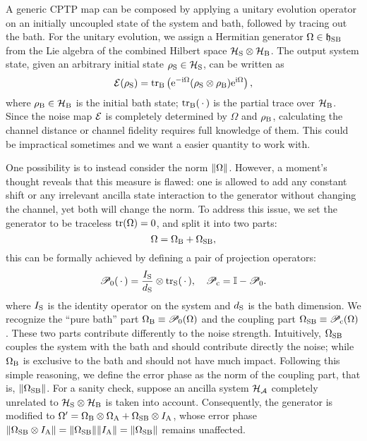 \documentclass[aps,pra,reprint,superscriptaddress]{revtex4-2}
\newcommand{\Ppb}{\mathscr{P}_{\mathrm{0}}}
\newcommand{\Pcp}{\mathscr{P}_{\mathrm{c}}}
\begin{document}
A generic CPTP map can be composed by applying a unitary evolution operator on an initially uncoupled state of the system and bath, followed by tracing out the bath.
For the unitary evolution, we assign a Hermitian generator $\Omega\in\mathfrak{h}_{\mathrm{SB}}$ from the Lie algebra of the combined Hilbert space $\mathcal{H}_{\mathrm{S}}\otimes\mathcal{H}_{\mathrm{B}}$. The output system state, given an arbitrary initial state $\rho_\mathrm{S}\in\mathcal{H}_{\mathrm{S}}$, can be written as
\begin{equation}\label{eq:output-rhos}
\mathcal{E}(\rho_\mathrm{S}) = \operatorname{\operatorname{tr}_\mathrm{B}}  \left(
\mathrm{e}^{-\mathrm{i} \Omega} (\rho_\mathrm{S} \otimes \rho_\mathrm{B}) \mathrm{e}^{\mathrm{i} \Omega} \right),
\end{equation}
where $\rho_\mathrm{B}\in\mathcal{H}_{\mathrm{B}}$ is the initial bath state; $\operatorname{\operatorname{tr}_\mathrm{B}}({\,\cdot\,})$ is the partial trace over $\mathcal{H}_{\mathrm{B}}$.
Since the noise map $\mathcal{E}$ is completely determined by $\Omega$ and $\rho_\mathrm{B}$, 
calculating the channel distance or channel fidelity requires full knowledge of them.  This could be impractical sometimes and we want a easier quantity to work with.

One possibility is to instead consider the norm $\Vert {\Omega} \Vert$. However, a moment's thought reveals that this measure is flawed: one is allowed to add any constant shift or any irrelevant ancilla state interaction to the generator without changing the channel, yet both will change the norm.
To address this issue, we set the generator to be traceless $\operatorname{tr}(\Omega)=0$, and 
split it into two parts:
\begin{equation}\label{eq:omega-split}
\Omega = \Omega_{\mathrm{B}} + \Omega_{\mathrm{SB}},
\end{equation}
this can be formally achieved by defining a pair of projection operators:
\begin{equation}
    \Ppb(\, \cdot \,) = \frac{I_\rS}{d_\rS} \otimes \trS(\, \cdot \,),
    \quad \Pcp = \mathbb{I} - \Ppb.
\end{equation}
where $I_{\mathrm{S}}$ is the identity operator on the system and $d_{\mathrm{S}}$ is the bath dimension. We recognize the ``pure bath'' part $\Omega_\rB \equiv \Ppb(\Omega)$ and the coupling part $\Omega_\rSB\equiv \Pcp(\Omega)$.  
These two parts contribute differently to the noise strength. Intuitively, $\Omega_{\mathrm{SB}}$  couples the system with the bath and should contribute directly the noise; while $\Omega_{\mathrm{B}}$ is exclusive to the bath and should not have much impact. Following this simple reasoning, we define the error phase as the norm of the coupling part,
that is, $\Vert {\Omega_{\mathrm{SB}}} \Vert$. 
For a sanity check, suppose an ancilla system $\mathcal{H}_{\mathcal{A}}$ completely unrelated to $\mathcal{H}_{\mathrm{S}}\otimes\mathcal{H}_{\mathrm{B}}$ is taken into account. Consequently, the generator is  modified to 
$\Omega' = \Omega_{\mathrm{B}} \otimes \Omega_{\mathrm{A}} + \Omega_{\mathrm{SB}}\otimes I_{\mathrm{A}}$, whose error phase $\Vert {\Omega_{\mathrm{SB}}\otimes I_{\mathrm{A}}} \Vert = \Vert {\Omega_{\mathrm{SB}}} \Vert \Vert {I_{\mathrm{A}}} \Vert=\Vert {\Omega_{\mathrm{SB}}} \Vert$ remains unaffected.
\end{document}
